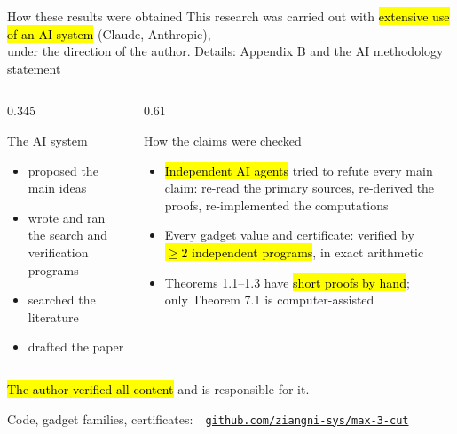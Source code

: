 \begin{frame}{How these results were obtained}
\vspace{-1mm}
This research was carried out with \hl{extensive use of an AI system} (Claude, Anthropic),\\
under the direction of the author.
\hfill{\small\color{soft}Details: Appendix B and the AI methodology statement}
\par\vspace{1.2mm}
\setlength{\leftmargini}{5mm}%
\begin{columns}[T,onlytextwidth]
\begin{column}{0.345\textwidth}
\begin{block}{The AI system}
\begin{itemize}\setlength{\itemsep}{4.2mm}
\item proposed the main ideas
\item wrote and ran the search and verification programs
\item searched the literature
\item drafted the paper
\end{itemize}
\end{block}
\end{column}
\begin{column}{0.61\textwidth}
\begin{block}{How the claims were checked}
\begin{itemize}\setlength{\itemsep}{1.7mm}
\item \hl{Independent AI agents} tried to refute every main claim:
  {\small\color{soft}re-read the primary sources, re-derived the proofs,
  re-implemented the computations}
\item Every gadget value and certificate: verified by\\
  \hl{$\ge2$ independent programs}, in exact arithmetic
\item Theorems 1.1--1.3 have \hl{short proofs by hand};\\ only Theorem 7.1 is computer-assisted
\end{itemize}
\end{block}
\end{column}
\end{columns}
\par\vspace{4.6mm}
\vspace{-2.4mm}\hl{The author verified all content} and is responsible for it.\par\vspace{0.4mm}
Code, gadget families, certificates:\ \
\href{https://github.com/ziangni-sys/max-3-cut}{\color{acc}\texttt{github.com/ziangni-sys/max-3-cut}}
\end{frame}

